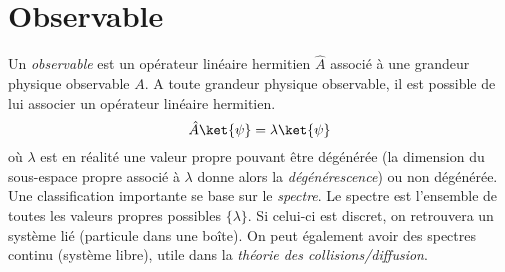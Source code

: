 \section{Observable}
Un \textit{observable} est un opérateur linéaire hermitien $\hat{A}$ associé à 
une grandeur physique observable $A$. A toute grandeur physique observable, il 
est possible de lui associer un opérateur linéaire  hermitien. 
\begin{equation}
\hat{A}\ket{\psi} = \lambda\ket{\psi}
\end{equation}
où $\lambda$ est en réalité une valeur propre pouvant être dégénérée (la dimension 
du sous-espace propre associé à $\lambda$ donne alors la \textit{dégénérescence}) 
ou non dégénérée.\\
Une classification importante se base sur le \textit{spectre}. Le spectre est
l'ensemble de toutes les valeurs propres possibles $\{\lambda\}$. Si celui-ci 
est discret, on retrouvera un système lié (particule dans une boîte). On 
peut également avoir des spectres continu (système libre), utile dans la 
\textit{théorie des collisions/diffusion}.\\

